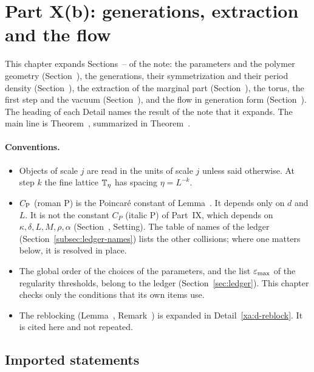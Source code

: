 \section{Part X(b): generations, extraction and the flow}\label{xb:sec}

This chapter expands Sections~-- of the note: the parameters and the polymer geometry (Section~), the generations, their symmetrization and their period density (Section~), the extraction of the marginal part (Section~), the torus, the first step and the vacuum (Section~), and the flow in generation form (Section~). The heading of each Detail names the result of the note that it expands. The main line is Theorem~, summarized in Theorem~.

\paragraph{Conventions.}
\begin{itemize}
\item Objects of scale $j$ are read in the units of scale $j$ unless said otherwise. At step $k$ the fine lattice $\mathbb T_\eta$ has spacing $\eta=L^{-k}$.
\item $C_{\rm P}$ (roman P) is the Poincar\'e constant of Lemma~. It depends only on $d$ and $L$. It is not the constant $C_P$ (italic P) of Part~IX, which depends on $\kappa,\delta,L,M,\rho,\alpha$ (Section~, Setting). The table of names of the ledger (Section~\ref{subsec:ledger-names}) lists the other collisions; where one matters below, it is resolved in place.
\item The global order of the choices of the parameters, and the list $\varepsilon_{\max}$ of the regularity thresholds, belong to the ledger (Section~\ref{sec:ledger}). This chapter checks only the conditions that its own items use.
\item The reblocking (Lemma~, Remark~) is expanded in Detail~\ref{xa:d-reblock}. It is cited here and not repeated.
\end{itemize}

\subsection{Imported statements}\label{xb:imports}

